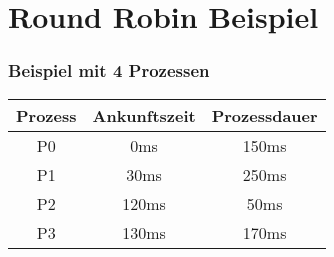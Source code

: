 \section{Round Robin Beispiel}

\begin{frame}
    \frametitle{Beispiel mit 4 Prozessen}


    \begin{table}[]
        \begin{adjustbox}{width=0.4\textwidth}
            \begin{tabular}{c|c|c}
                \textbf{Prozess} & \textbf{Ankunftszeit} & \textbf{Prozessdauer} \\
                \hline{}
                P0               & 0ms                   & 150ms                 \\
                P1               & 30ms                  & 250ms                 \\
                P2               & 120ms                 & 50ms                  \\
                P3               & 130ms                 & 170ms
            \end{tabular}
        \end{adjustbox}
    \end{table}


\end{frame}
